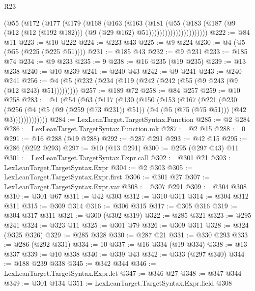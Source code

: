 \begin{lexlean}{R23}
\begin{coremodule}
                      (@55
                        (@172
                          (@177
                            (@179
                              (@168
                                (@163
                                  (@163
                                    (@181
                                      (@55
                                        (@183
                                          (@187
                                            (@9
                                              (@12 (@12 (@192 @182)))
                                              (@9 (@29 @162) @51))))))))))))))))))))))
@222 := @84 @11
@223 := @10 @222
@224 := @223 @43
@225 := @9 @224
@230 := @4 (@5 (@55 (@225 (@225 @51))))
@231 := @185 @43
@232 := @9 @231
@233 := @185 @74
@234 := @9 @233
@235 := 9
@238 := @16 @235 (@19 @235)
@239 := @13 @238
@240 := @10 @239
@241 := @240 @43
@242 := @9 @241
@243 := @240 @241
@256 := @4 (@5 (@232 (@234 (@119 (@242 (@242 (@55 (@9 @243 (@9 (@12 @243) @51)))))))))
@257 := @189 @72
@258 := @84 @257
@259 := @10 @258
@283 := @1
    (@54
      (@63
        (@117
          (@130
            (@150
              (@153
                (@167
                  (@221
                    (@230
                      (@256
                        (@4
                          (@5 (@9 (@259 (@73 @231)) @51))
                          (@4 (@5 (@75 (@75 @51))) (@42 @3)))))))))))))
@284 := LexLeanTarget.TargetSyntax.Function
@285 := @2 @284
@286 := LexLeanTarget.TargetSyntax.Function.mk
@287 := @2 @15
@288 := 0
@291 := @16 @288 (@19 @288)
@292 := @287 @291
@293 := @42 @15
@295 := @286 (@292 @293)
@297 := @10 (@13 @291)
@300 := @295 (@297 @43) @11
@301 := LexLeanTarget.TargetSyntax.Expr.call
@302 := @301 @21
@303 := LexLeanTarget.TargetSyntax.Expr
@304 := @2 @303
@305 := LexLeanTarget.TargetSyntax.Expr.first
@306 := @301 @27
@307 := LexLeanTarget.TargetSyntax.Expr.var
@308 := @307 @291
@309 := @304 @308
@310 := @301 @67
@311 := @42 @303
@312 := @310 @311
@314 := @304 @312 @311
@315 := @309 @314
@316 := @306 @315
@317 := @305 @316
@319 := @304 @317 @311
@321 := @300 (@302 @319)
@322 := @285 @321
@323 := @295 @241
@324 := @323 @11
@325 := @301 @79
@326 := @309 @311
@328 := @324 (@325 @326)
@329 := @285 @328
@330 := @287 @21
@331 := @330 @293
@333 := @286 (@292 @331)
@334 := 10
@337 := @16 @334 (@19 @334)
@338 := @13 @337
@339 := @10 @338
@340 := @339 @43
@342 := @333 (@297 @340)
@344 := @188 @239 @338
@345 := @342 @344
@346 := LexLeanTarget.TargetSyntax.Expr.let
@347 := @346 @27
@348 := @347 @344
@349 := @301 @134
@351 := LexLeanTarget.TargetSyntax.Expr.field @308

\end{coremodule}
\end{lexlean}
